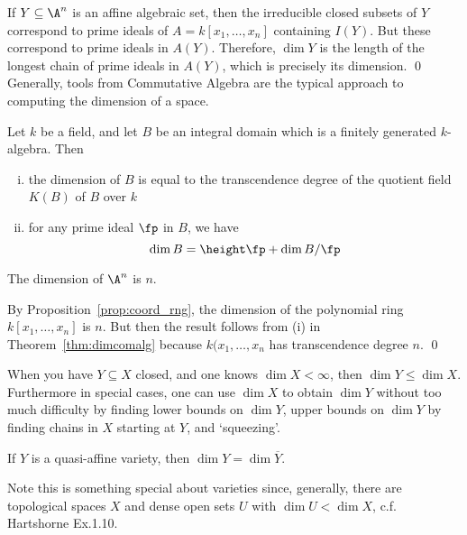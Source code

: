 \pf If $Y \subseteq \A^n$ is an affine algebraic set, then the irreducible closed subsets of $Y$ correspond to prime ideals of $A= k[x_1,\ldots,x_n]$ containing $I(Y)$. But these correspond to prime ideals in $A(Y)$. Therefore, $\dim Y$ is the length of the longest chain of prime ideals in $A(Y)$, which is precisely its dimension. \qed \\


Generally, tools from Commutative Algebra are the typical approach to computing the dimension of a space. 


\begin{thm} \label{thm:dimcomalg}
Let $k$ be a field, and let $B$ be an integral domain which is a finitely generated $k$-algebra. Then
	\begin{enumerate}[(i)]
	\item the dimension of $B$ is equal to the  transcendence degree of the quotient field $K(B)$ of $B$ over $k$
	\item for any prime ideal $\fp$ in $B$, we have
		\[
		\dim B= \height \fp + \dim B/\fp
		\]
	\end{enumerate}
\end{thm}


\begin{prop}
The dimension of $\A^n$ is $n$.
\end{prop}

\pf By Proposition~\ref{prop:coord_rng}, the dimension of the polynomial ring $k[x_1,\ldots,x_n]$ is $n$. But then the result follows from (i) in Theorem~\ref{thm:dimcomalg} because $k(x_1,\ldots,x_n$ has transcendence degree $n$. \qed \\


\begin{rem}
When you have $Y \subseteq X$ closed, and one knows $\dim X < \infty$, then $\dim Y \leq \dim X$. Furthermore in special cases, one can use $\dim X$ to obtain $\dim Y$ without too much difficulty by finding lower bounds on $\dim Y$, upper bounds on $\dim Y$ by finding chains in $X$ starting at $Y$, and `squeezing'. 
\end{rem}


\begin{prop}
If $Y$ is a quasi-affine variety, then $\dim Y= \dim \overline{Y}$.
\end{prop}



Note this is something special about varieties since, generally, there are topological spaces $X$ and dense open sets $U$ with $\dim U < \dim X$, c.f. Hartshorne Ex.1.10. 
















